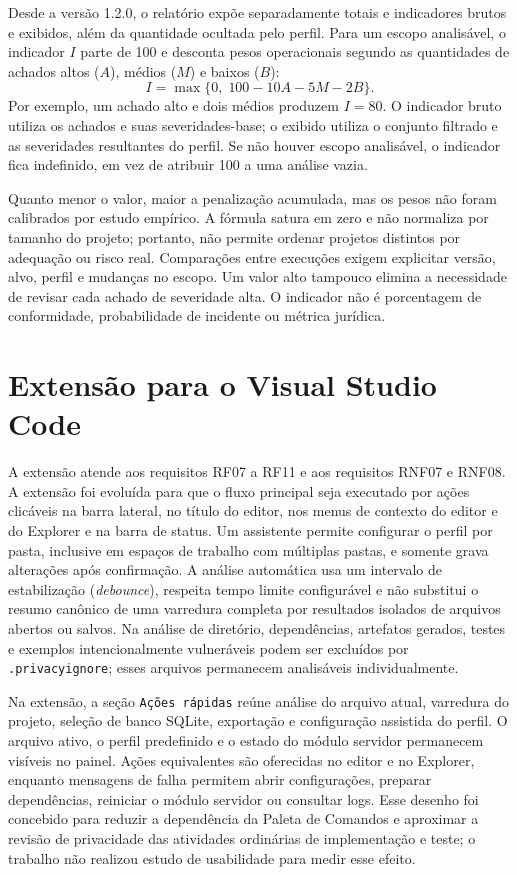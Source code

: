 \documentclass[12pt,a4paper,oneside]{report}
\begin{document}
Desde a versão 1.2.0, o relatório expõe separadamente totais e indicadores brutos e exibidos, além da quantidade ocultada pelo perfil. Para um escopo analisável, o indicador $I$ parte de 100 e desconta pesos operacionais segundo as quantidades de achados altos ($A$), médios ($M$) e baixos ($B$):
\[
I=\max\{0,\;100-10A-5M-2B\}.
\]
Por exemplo, um achado alto e dois médios produzem $I=80$. O indicador bruto utiliza os achados e suas severidades-base; o exibido utiliza o conjunto filtrado e as severidades resultantes do perfil. Se não houver escopo analisável, o indicador fica indefinido, em vez de atribuir 100 a uma análise vazia.

Quanto menor o valor, maior a penalização acumulada, mas os pesos não foram calibrados por estudo empírico. A fórmula satura em zero e não normaliza por tamanho do projeto; portanto, não permite ordenar projetos distintos por adequação ou risco real. Comparações entre execuções exigem explicitar versão, alvo, perfil e mudanças no escopo. Um valor alto tampouco elimina a necessidade de revisar cada achado de severidade alta. O indicador não é porcentagem de conformidade, probabilidade de incidente ou métrica jurídica.

\section{Extensão para o Visual Studio Code}

A extensão atende aos requisitos RF07 a RF11 e aos requisitos RNF07 e RNF08. A extensão foi evoluída para que o fluxo principal seja executado por ações clicáveis na barra lateral, no título do editor, nos menus de contexto do editor e do Explorer e na barra de status. Um assistente permite configurar o perfil por pasta, inclusive em espaços de trabalho com múltiplas pastas, e somente grava alterações após confirmação. A análise automática usa um intervalo de estabilização (\textit{debounce}), respeita tempo limite configurável e não substitui o resumo canônico de uma varredura completa por resultados isolados de arquivos abertos ou salvos. Na análise de diretório, dependências, artefatos gerados, testes e exemplos intencionalmente vulneráveis podem ser excluídos por \texttt{.privacyignore}; esses arquivos permanecem analisáveis individualmente.

Na extensão, a seção \texttt{Ações rápidas} reúne análise do arquivo atual, varredura do projeto, seleção de banco SQLite, exportação e configuração assistida do perfil. O arquivo ativo, o perfil predefinido e o estado do módulo servidor permanecem visíveis no painel. Ações equivalentes são oferecidas no editor e no Explorer, enquanto mensagens de falha permitem abrir configurações, preparar dependências, reiniciar o módulo servidor ou consultar logs. Esse desenho foi concebido para reduzir a dependência da Paleta de Comandos e aproximar a revisão de privacidade das atividades ordinárias de implementação e teste; o trabalho não realizou estudo de usabilidade para medir esse efeito.
\end{document}

